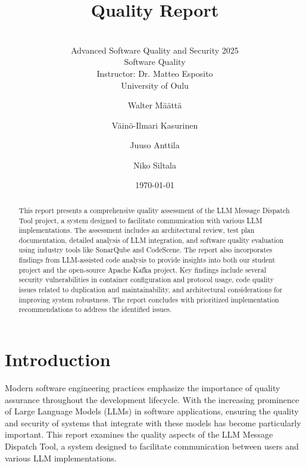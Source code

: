 \documentclass[sigconf]{acmart}
\begin{document}
\title{Quality Report}
\subtitle{\\[0.5cm] Advanced Software Quality and Security 2025 \\ Software Quality \\ Instructor: Dr. Matteo Esposito \\ University of Oulu}

\author{Walter Määttä}

\author{Väinö-Ilmari Kasurinen}

\author{Juuso Anttila}

\author{Niko Siltala}

\date{\today}


\begin{abstract}
This report presents a comprehensive quality assessment of the LLM Message Dispatch Tool project, a system designed to facilitate communication with various LLM implementations. The assessment includes an architectural review, test plan documentation, detailed analysis of LLM integration, and software quality evaluation using industry tools like SonarQube and CodeScene. The report also incorporates findings from LLM-assisted code analysis to provide insights into both our student project and the open-source Apache Kafka project. Key findings include several security vulnerabilities in container configuration and protocol usage, code quality issues related to duplication and maintainability, and architectural considerations for improving system robustness. The report concludes with prioritized implementation recommendations to address the identified issues.
\end{abstract}

\maketitle

\section{Introduction}
Modern software engineering practices emphasize the importance of quality assurance throughout the development lifecycle. With the increasing prominence of Large Language Models (LLMs) in software applications, ensuring the quality and security of systems that integrate with these models has become particularly important. This report examines the quality aspects of the LLM Message Dispatch Tool, a system designed to facilitate communication between users and various LLM implementations.
\end{document}

